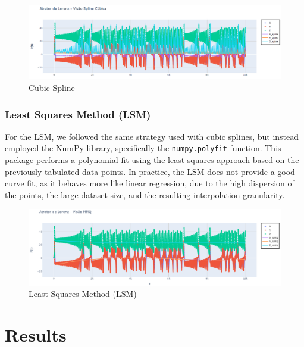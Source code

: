 \documentclass[12pt, a4paper]{article}
\begin{document}
	\begin{figure}[H]
		\centering
		\includegraphics[width=\textwidth]{img/spline.png}
		\caption{Cubic Spline}
		\label{fig:spline}
	\end{figure}
	
	\subsubsection{Least Squares Method (LSM)}
	
	For the LSM, we followed the same strategy used with cubic splines, but instead employed the
	\href{https://numpy.org/doc/stable/index.html}{NumPy} library, specifically the \texttt{numpy.polyfit} function.
	This package performs a polynomial fit using the least squares approach based on the previously tabulated data points.
	In practice, the LSM does not provide a good curve fit, as it behaves more like linear regression,
	due to the high dispersion of the points, the large dataset size, and the resulting interpolation granularity.
	
	\begin{figure}[H]
		\centering
		\includegraphics[width=\textwidth]{img/mmq.png}
		\caption{Least Squares Method (LSM)}
		\label{fig:mmq}
	\end{figure}
	
	\newpage
	
	    
	    
	\section{Results}
\end{document}
